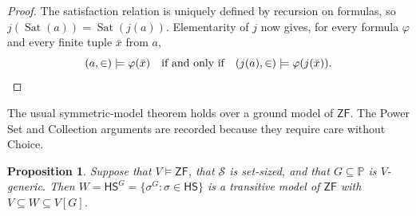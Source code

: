\documentclass[11pt,a4paper]{amsart}
\newcommand{\ZF}{\mathsf{ZF}}
\newcommand{\HS}{\mathsf{HS}}
\theoremstyle{plain}
\newtheorem{proposition}[theorem]{Proposition}
\theoremstyle{definition}
\theoremstyle{remark}
\begin{document}
\begin{proof}
The satisfaction relation is uniquely defined by recursion on formulas, so
$j(\operatorname{Sat}(a))=\operatorname{Sat}(j(a))$.  Elementarity of $j$ now gives, for every formula $\varphi$ and every finite tuple $\bar x$ from $a$,
\[
(a,\in)\models\varphi(\bar x)
\quad\text{if and only if}\quad
(j(a),\in)\models\varphi(j(\bar x)).\qedhere
\]
\end{proof}

The usual symmetric-model theorem holds over a ground model of $\ZF$.  The Power Set and Collection arguments are recorded because they require care without Choice.

\begin{proposition}\label{prop:symmetric-ZF}
Suppose that $V\models\ZF$, that $\mathscr S$ is set-sized, and that $G\subseteq\mathbb P$ is $V$-generic.  Then
$W=\HS^G=\{\sigma^G:\sigma\in\HS\}$ is a transitive model of $\ZF$ with $V\subseteq W\subseteq V[G]$.
\end{proposition}
\end{document}

